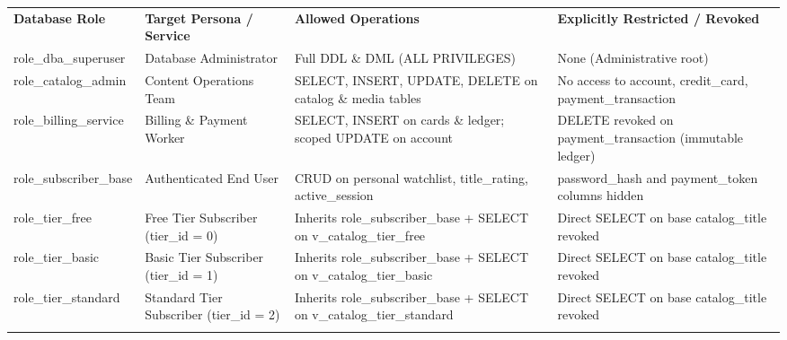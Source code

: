 {\def\LTcaptype{none} %
\begin{longtable}[]{@{}
  >{\raggedright\arraybackslash}p{}
  >{\raggedright\arraybackslash}p{}
  >{\raggedright\arraybackslash}p{}
  >{\raggedright\arraybackslash}p{}@{}}
\arrayrulecolor{black}\toprule\noalign{}
\endhead
\bottomrule\noalign{}
\endlastfoot
\textbf{Database Role} & \textbf{Target Persona / Service} & \textbf{Allowed Operations} & \textbf{Explicitly Restricted / Revoked} \\ \arrayrulecolor{black!20}\midrule
role\_\allowbreak{}dba\_\allowbreak{}superuser & Database Administrator & Full DDL \& DML (ALL PRIVILEGES) & None (Administrative root) \\ \arrayrulecolor{black!20}\midrule
role\_\allowbreak{}catalog\_\allowbreak{}admin & Content Operations Team & SELECT, INSERT, UPDATE, DELETE on catalog \& media tables & No access to account, credit\_\allowbreak{}card, payment\_\allowbreak{}transaction \\ \arrayrulecolor{black!20}\midrule
role\_\allowbreak{}billing\_\allowbreak{}service & Billing \& Payment Worker & SELECT, INSERT on cards \& ledger; scoped UPDATE on account & DELETE revoked on payment\_\allowbreak{}transaction (immutable ledger) \\ \arrayrulecolor{black!20}\midrule
role\_\allowbreak{}subscriber\_\allowbreak{}base & Authenticated End User & CRUD on personal watchlist, title\_\allowbreak{}rating, active\_\allowbreak{}session & password\_\allowbreak{}hash and payment\_\allowbreak{}token columns hidden \\ \arrayrulecolor{black!20}\midrule
role\_\allowbreak{}tier\_\allowbreak{}free & Free Tier Subscriber (tier\_\allowbreak{}id = 0) & Inherits role\_\allowbreak{}subscriber\_\allowbreak{}base + SELECT on v\_\allowbreak{}catalog\_\allowbreak{}tier\_\allowbreak{}free & Direct SELECT on base catalog\_\allowbreak{}title revoked \\ \arrayrulecolor{black!20}\midrule
role\_\allowbreak{}tier\_\allowbreak{}basic & Basic Tier Subscriber (tier\_\allowbreak{}id = 1) & Inherits role\_\allowbreak{}subscriber\_\allowbreak{}base + SELECT on v\_\allowbreak{}catalog\_\allowbreak{}tier\_\allowbreak{}basic & Direct SELECT on base catalog\_\allowbreak{}title revoked \\ \arrayrulecolor{black!20}\midrule
role\_\allowbreak{}tier\_\allowbreak{}standard & Standard Tier Subscriber (tier\_\allowbreak{}id = 2) & Inherits role\_\allowbreak{}subscriber\_\allowbreak{}base + SELECT on v\_\allowbreak{}catalog\_\allowbreak{}tier\_\allowbreak{}standard & Direct SELECT on base catalog\_\allowbreak{}title revoked \\ \arrayrulecolor{black!20}\midrule

\end{longtable}}

